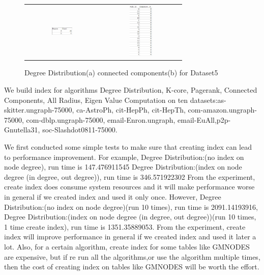 \begin{figure}[H]
\begin{center}
\begin{tabular}{cc}
     \includegraphics[width=0.3\textwidth]{FIG/5dd.jpg} &
     \includegraphics[width=0.3\textwidth]{FIG/5cc.jpg} \\
\end{tabular}
\caption{Degree Distribution(a) connected components(b) for Dataset5}
\end{center}
\end{figure}


We build index for algorithms Degree Distribution, K-core, Pagerank, Connected Components, All Radius, Eigen Value Computation on ten datasets:as-skitter.ungraph-75000, ca-AstroPh, cit-HepPh, cit-HepTh, com-amazon.ungraph-75000, com-dblp.ungraph-75000, email-Enron.ungraph, email-EuAll,p2p-Gnutella31, soc-Slashdot0811-75000.

We first conducted some simple tests to make sure that creating index can lead to performance improvement.
For example, 
Degree Distribution:(no index on node degree), run time is 147.476911545
Degree Distribution:(index on node degree (in degree, out degree)), run time is 346.571922302
From the experiment, create index does consume system resources and it will make performance worse in general if we
created index and used it only once.
However, 
Degree Distribution:(no index on node degree)(run 10 times), run time is 2091.14193916,
Degree Distribution:(index on node degree (in degree, out degree))(run 10 times, 1 time create index), run time is 1351.35889053.
From the experiment, create index will improve performance in general if we created index and used it later a lot.
Also, for a certain algorithm, create index for some tables like GMNODES are expensive, but if re run all the algorithms,or use the algorithm multiple times, then the cost of creating index on tables like GMNODES will be worth the effort.

